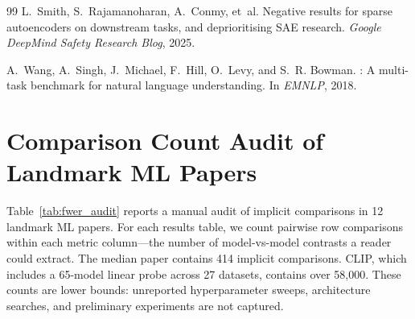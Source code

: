\documentclass{article}
\begin{document}
\begin{thebibliography}{99}
L.~Smith, S.~Rajamanoharan, A.~Conmy, et~al.
\newblock Negative results for sparse autoencoders on downstream tasks, and deprioritising {SAE} research.
\newblock \emph{Google DeepMind Safety Research Blog}, 2025.

A.~Wang, A.~Singh, J.~Michael, F.~Hill, O.~Levy, and S.~R. Bowman.
: A multi-task benchmark for natural language understanding.
\newblock In \emph{EMNLP}, 2018.

\end{thebibliography}

\appendix

\section{Comparison Count Audit of Landmark ML Papers}
\label{app:landmark_audit}

Table~\ref{tab:fwer_audit} reports a manual audit of implicit comparisons in 12 landmark ML papers. For each results table, we count pairwise row comparisons within each metric column---the number of model-vs-model contrasts a reader could extract. The median paper contains 414 implicit comparisons. CLIP, which includes a 65-model linear probe across 27 datasets, contains over 58,000. These counts are lower bounds: unreported hyperparameter sweeps, architecture searches, and preliminary experiments are not captured.
\end{document}
